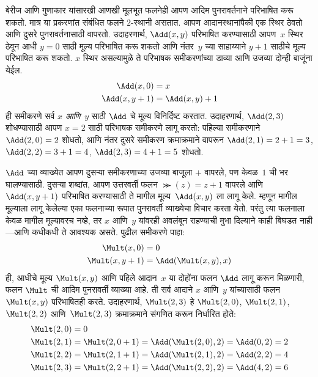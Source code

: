 \documentclass[../../../include/open-logic-section]{subfiles}
\begin{document}
बेरीज आणि गुणाकार यांसारखी आणखी मूलभूत फलनेही आपण आदिम पुनरावर्तनाने
परिभाषित करू शकतो. मात्र या प्रकरणांत संबंधित फलने $2$-स्थानी असतात.
आपण आदानस्थानांपैकी एक स्थिर ठेवतो आणि दुसरे पुनरावर्तनासाठी वापरतो.
उदाहरणार्थ, $\Add(x, y)$ परिभाषित करण्यासाठी आपण~$x$ स्थिर ठेवून आधी
$y=0$ साठी मूल्य परिभाषित करू शकतो आणि नंतर~$y$ च्या साहाय्याने $y+1$
साठीचे मूल्य परिभाषित करू शकतो. $x$ स्थिर असल्यामुळे ते परिभाषक
समीकरणांच्या डाव्या आणि उजव्या दोन्ही बाजूंना येईल.
\begin{align*}
\Add(x,0) & =  x\\
\Add(x,y+1) & =  \Add(x,y)+1
\end{align*}
ही समीकरणे सर्व $x$ \emph{आणि}~$y$ साठी $\Add$ चे मूल्य विनिर्दिष्ट
करतात. उदाहरणार्थ, $\Add(2,3)$ शोधण्यासाठी आपण $x = 2$ साठी परिभाषक
समीकरणे लागू करतो: पहिल्या समीकरणाने $\Add(2,0) = 2$ शोधतो, आणि नंतर
दुसरे समीकरण क्रमाक्रमाने वापरून $\Add(2,1) = 2 + 1 = 3$,
$\Add(2, 2) = 3 + 1 = 4$, $\Add(2, 3) = 4 + 1 = 5$ शोधतो.

$\Add$ च्या व्याख्येत आपण दुसऱ्या समीकरणाच्या उजव्या बाजूला $+$ वापरले,
पण केवळ~$1$ ची भर घालण्यासाठी. दुसऱ्या शब्दांत, आपण उत्तरवर्ती फलन
$\Succ(z) = z+1$ वापरले आणि $\Add(x,y+1)$ परिभाषित करण्यासाठी ते मागील
मूल्य~$\Add(x,y)$ ला लागू केले. म्हणून मागील मूल्याला लागू केलेल्या एका
फलनाच्या रूपात पुनरावर्ती व्याख्येचा विचार करता येतो. परंतु त्या फलनाला
केवळ मागील मूल्यावरच नव्हे, तर $x$ आणि~$y$ यांवरही अवलंबून राहण्याची
मुभा दिल्याने काही बिघडत नाही---आणि कधीकधी ते आवश्यक असते. पुढील
समीकरणे पाहा:
\begin{align*}
  \Mult(x,0) & =  0 \\
  \Mult(x,y+1) & =  \Add(\Mult(x,y),x)
\end{align*}
ही, आधीचे मूल्य $\Mult(x,y)$ आणि पहिले आदान~$x$ या दोहोंना फलन
$\Add$ लागू करून मिळणारी, फलन $\Mult$ ची आदिम पुनरावर्ती व्याख्या आहे.
ती सर्व आदाने $x$ आणि~$y$ यांच्यासाठी फलन~$\Mult(x,y)$ परिभाषितही करते.
उदाहरणार्थ, $\Mult(2,3)$ हे $\Mult(2,0)$, $\Mult(2,1)$,
$\Mult(2,2)$ आणि~$\Mult(2,3)$ क्रमाक्रमाने संगणित करून निर्धारित होते:
\begin{align*}
  \Mult(2,0) & = 0\\
  \Mult(2,1) & = \Mult(2,0+1) =
  \Add(\Mult(2,0), 2) = \Add(0, 2) = 2\\
  \Mult(2,2) & = \Mult(2,1+1) =
  \Add(\Mult(2,1), 2) = \Add(2, 2) = 4\\
  \Mult(2,3) & = \Mult(2,2+1) =
  \Add(\Mult(2,2), 2) = \Add(4, 2) = 6
\end{align*}
\end{document}
